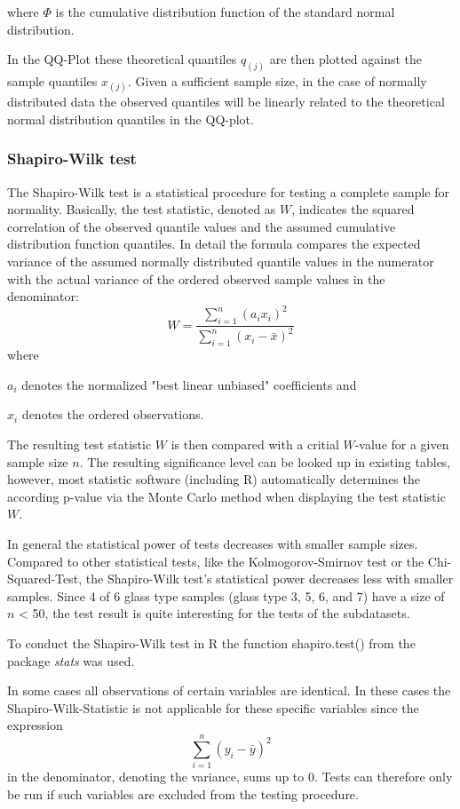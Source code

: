 \documentclass[a4paper, 12pt, titlepage, headsepline, listof = totoc, bibliography = totoc, numbers = noenddot]{scrartcl}
\begin{document}
where $\Phi$ is the cumulative distribution function of the standard normal distribution.

In the QQ-Plot these theoretical quantiles $q_{(j)}$ are then plotted against the sample quantiles $x_{(j)}$. Given a sufficient sample size, in the case of normally distributed data the observed quantiles will be linearly related to the theoretical normal distribution quantiles in the QQ-plot.

\subsubsection{Shapiro-Wilk test}\label{sec:shapiro-theoretical}

The Shapiro-Wilk test is a statistical procedure for testing a complete sample for normality. Basically, the test statistic, denoted as $W$, indicates the squared correlation of the observed quantile values and the assumed cumulative distribution function quantiles. In detail the formula compares the expected variance of the assumed normally distributed quantile values in the numerator with the actual variance of the ordered observed sample values in the denominator:
\[ W = \frac{\sum \limits_{i=1}^n (a_i x_i)^2} {\sum \limits_{i=1}^n (x_i-\bar{x})^2}\]
where

$a_i$ denotes the normalized "best linear unbiased" coefficients and

$x_i$ denotes the ordered observations.

The resulting test statistic $W$ is then compared with a critial $W$-value for a given sample size $n$. The resulting significance level can be looked up in existing tables, however, most statistic software (including R) automatically determines the according p-value via the Monte Carlo method when displaying the test statistic $W$.

In general the statistical power of tests decreases with smaller sample sizes. Compared to other statistical tests, like the Kolmogorov-Smirnov test or the Chi-Squared-Test, the Shapiro-Wilk test's statistical power decreases less with smaller samples. Since 4 of 6 glass type samples (glass type 3, 5, 6, and 7) have a size of $n$ < 50, the test result is quite interesting for the tests of the subdatasets.

To conduct the Shapiro-Wilk test in R the function shapiro.test() from the package \textit{stats} was used.

In some cases all observations of certain variables are identical. In these cases the Shapiro-Wilk-Statistic is not applicable for these specific variables since the expression 
\[ \sum \limits_{i=1}^n (y_i - \bar{y})^2 \]
in the denominator, denoting the variance, sums up to 0. Tests can therefore only be run if such variables are excluded from the testing procedure.
\end{document}
